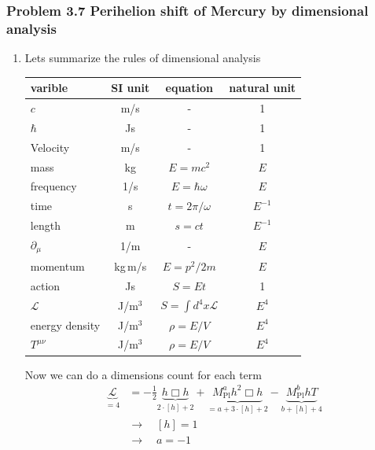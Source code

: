 \documentclass[10pt,a4paper]{book}
\theoremstyle{definition}
\begin{document}
\subsubsection{Problem 3.7 Perihelion shift of Mercury by dimensional analysis}
\begin{enumerate}[label=(\alph*)]
\item Lets summarize the rules of dimensional analysis 

\begin{center}
\begin{tabular}{ lccc } 
 \hline
 varible & SI unit &equation & natural unit \\ 
 \hline\hline
 $c$               & m/s    & -                        & 1        \\
 $\hbar$           & Js     & -                        & 1        \\
 Velocity          & m/s    & -                        & 1      \\
 mass              & kg     & $E=mc^2$                 & $E$      \\
 frequency         & 1/s    & $E=\hbar\omega$          & $E$      \\
 time              & s      & $t=2\pi/\omega$          & $E^{-1}$ \\
 length            & m      & $s=ct$                   & $E^{-1}$ \\
 $\partial_\mu$    & 1/m    & -                        & $E$      \\
 momentum          & kg\,m/s& $E=p^2/2m$               & $E$      \\
 action            & Js     & $S=Et$                   & 1        \\
 $\mathcal{L}$     & J/m$^3$& $S=\int d^4x\mathcal{L}$ & $E^4$    \\
 energy density    & J/m$^3$& $\rho=E/V$               & $E^4$    \\
 $T^{\mu\nu}$      & J/m$^3$& $\rho=E/V$               & $E^4$    \\
 \hline
\end{tabular}
\end{center}
Now we can do a dimensions count for each term
\begin{align}
\underbrace{\mathcal{L}}_{=4}&=-\frac{1}{2}\underbrace{h\Box h}_{2\cdot[h]+2}+ \underbrace{M_\text{Pl}^a h^2\Box h}_{=a+3\cdot[h]+2}-\underbrace{M_\text{Pl}^bhT}_{b+[h]+4}\\
&\rightarrow\quad[h]=1\\
&\rightarrow\quad a=-1\\

\end{align}
\end{enumerate}
\end{document}
